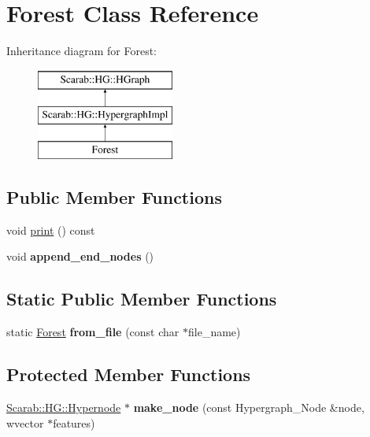 \hypertarget{class_forest}{
\section{Forest Class Reference}
\label{class_forest}
}
Inheritance diagram for Forest:\begin{figure}[H]
\begin{center}
\leavevmode
\includegraphics[height=3cm]{class_forest}
\end{center}
\end{figure}
\subsection*{Public Member Functions}
\begin{DoxyCompactItemize}
\item 
void \hyperlink{class_forest_a621a1a65d0f877bb33b15c79f9e24c4d}{print} () const 
\item 
\hypertarget{class_forest_a4cc0cf94c18913eadd0b36f3dcf68cef}{
void {\bfseries append\_\-end\_\-nodes} ()}
\label{class_forest_a4cc0cf94c18913eadd0b36f3dcf68cef}

\end{DoxyCompactItemize}
\subsection*{Static Public Member Functions}
\begin{DoxyCompactItemize}
\item 
\hypertarget{class_forest_a1b9ddc0e03c1ccfcc73987fe9378fa84}{
static \hyperlink{class_forest}{Forest} {\bfseries from\_\-file} (const char $\ast$file\_\-name)}
\label{class_forest_a1b9ddc0e03c1ccfcc73987fe9378fa84}

\end{DoxyCompactItemize}
\subsection*{Protected Member Functions}
\begin{DoxyCompactItemize}
\item 
\hypertarget{class_forest_ab40070ea9e3885d252fb7848c11f27ef}{
\hyperlink{class_scarab_1_1_h_g_1_1_hypernode}{Scarab::HG::Hypernode} $\ast$ {\bfseries make\_\-node} (const Hypergraph\_\-Node \&node, wvector $\ast$features)}
\label{class_forest_ab40070ea9e3885d252fb7848c11f27ef}

\end{DoxyCompactItemize}


